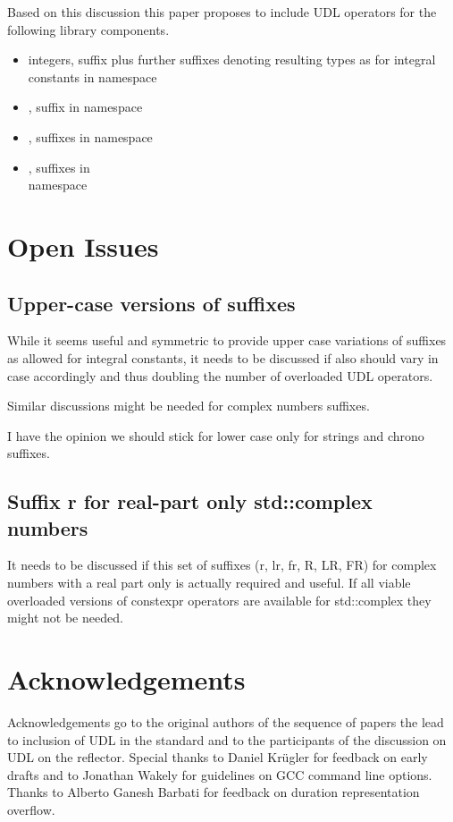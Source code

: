\documentclass[ebook,11pt,article]{memoir}
\begin{document}
Based on this discussion this paper proposes to include UDL operators for the following library components.
\begin{itemize}
\item {} integers, suffix  plus further suffixes denoting resulting types as for integral constants in namespace 
\item {}, suffix  in namespace 
\item {}, suffixes  in namespace 
\item {}, suffixes  in \\namespace {}
\end{itemize}

\section{Open Issues}
\subsection{Upper-case versions of suffixes}
While it seems useful and symmetric to provide upper case variations of suffixes  as allowed for integral constants, it needs to be discussed if also  should vary in case accordingly and thus doubling the number of overloaded UDL operators.

Similar discussions might be needed for complex numbers suffixes.

I have the opinion we should stick for lower case only for strings and chrono suffixes. 

\subsection{Suffix r for real-part only std::complex numbers}
It needs to be discussed if this set of suffixes (r, lr, fr, R, LR, FR) for complex numbers with a real part only is actually required and useful. If all viable overloaded versions of constexpr operators are available for std::complex they might not be needed.

\section{Acknowledgements}
Acknowledgements go to the original authors of the sequence of papers the lead to inclusion of UDL in the standard and to the participants of the discussion on UDL on the reflector. Special thanks to Daniel Kr\"ugler for feedback on early drafts and to Jonathan Wakely for guidelines on GCC command line options. Thanks to Alberto Ganesh Barbati for feedback on duration representation overflow.
\end{document}
